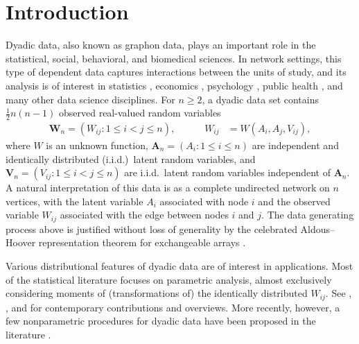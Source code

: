 \documentclass[11pt,lof]{puthesis}
\newcommand{\bW}{\ensuremath{\mathbf{W}}}
\newcommand{\bA}{\ensuremath{\mathbf{A}}}
\newcommand{\bV}{\ensuremath{\mathbf{V}}}
\theoremstyle{break}
\theoremstyle{proof}
\begin{document}
\section{Introduction}
\label{sec:kernel_introduction}

Dyadic data, also known as graphon data, plays an important role in the
statistical, social, behavioral, and biomedical sciences. In network settings,
this type of dependent data captures interactions between the units of study,
and its analysis is of interest in statistics \citep{kolaczyk2009statistical},
economics \citep{graham2020network}, psychology \citep{kenny2020dyadic}, public
health \citep{luke2007network}, and many other data science disciplines. For
$n \geq 2$, a dyadic data set contains $\frac{1}{2}n(n-1)$ observed real-valued
random variables
%
\begin{align*}
  \bW_n = (W_{i j}:1\leq i<j \leq n),
  \quad\qquad W_{i j}
  &= W(A_i,A_j,V_{i j}),
\end{align*}
%
where $W$ is an unknown function, $\bA_n=(A_{i}:1\leq i \leq n)$ are
independent and identically distributed (i.i.d.)\ latent random variables, and
$\bV_n=(V_{i j}:1\leq i<j \leq n)$ are i.i.d.\ latent random variables
independent of $\bA_n$. A natural interpretation of this data is as a complete
undirected network on $n$ vertices, with the latent variable $A_i$ associated
with node $i$ and the observed variable $W_{i j}$ associated with the edge
between nodes $i$ and $j$. The data generating process above is justified
without loss of generality by the celebrated Aldous--Hoover representation
theorem for exchangeable arrays
\citep{aldous1981representations,hoover1979relations}.

Various distributional features of dyadic data are of interest in applications.
Most of the statistical literature focuses on parametric analysis, almost
exclusively considering moments of (transformations of) the identically
distributed $W_{i j}$. See \citet{davezies2021exchangeable},
\citet{gao2021minimax}, and \citet{matsushita2021jackknife} for
contemporary contributions and overviews. More recently, however, a few
nonparametric procedures for dyadic data have been proposed in the literature
\citep{graham2021minimax,graham2024kernel}.
\end{document}
